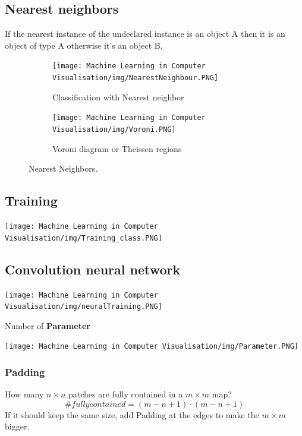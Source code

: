 \documentclass[x11names,11pt,a4paper]{article}
\theoremstyle{definition}
\begin{document}
\subsection{Nearest neighbors}
If the nearest instance of the undeclared instance is an object A then it is an object of type A otherwise it's an object B.
\begin{figure}[H]
     \centering
     \begin{subfigure}[b]{0.45\textwidth}
         \centering
         \texttt{[image: Machine Learning in Computer Visualisation/img/NearestNeighbour.PNG]}
         \caption{Classification  with Nearest neighbor}
     \end{subfigure}
     \hfill
     \begin{subfigure}[b]{0.45\textwidth}
         \centering
         \texttt{[image: Machine Learning in Computer Visualisation/img/Voroni.PNG]}
         \caption{Voroni diagram or Theissen regions}
     \end{subfigure}

        \caption{Nearest Neighbors.}
        \label{fig:Start variants}
\end{figure}

\subsection{Training}
\begin{center}
	\texttt{[image: Machine Learning in Computer Visualisation/img/Training\_class.PNG]}
\end{center}

\subsection{Convolution neural network}
\begin{center}
	\texttt{[image: Machine Learning in Computer Visualisation/img/neuralTraining.PNG]}
\end{center}
Number of \textbf{Parameter}
\begin{center}
	\texttt{[image: Machine Learning in Computer Visualisation/img/Parameter.PNG]}
\end{center}

\subsubsection{Padding}
How many $n \times n$ patches are fully contained in a $m \times m$ map?
\begin{equation}
    \#fully contained = (m-n+1)\cdot(m-n+1)
\end{equation}
If it should keep the same size, add Padding at the edges to make the $m \times m$ bigger.
\end{document}
